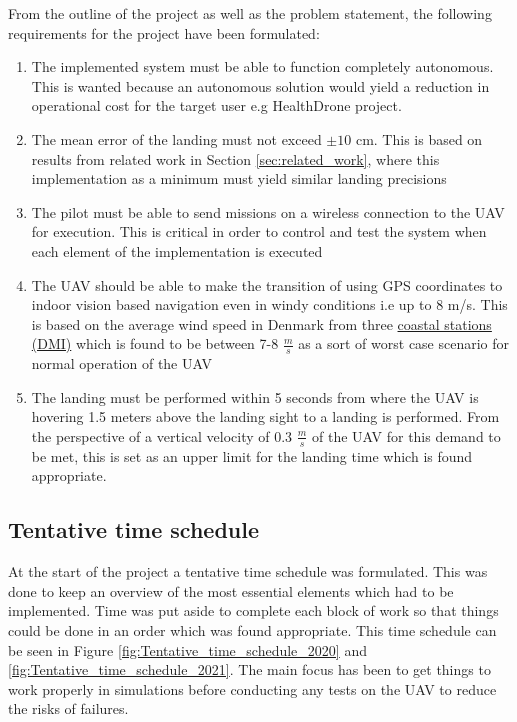 \documentclass[../Head/report.tex]{subfiles}
\begin{document}
From the outline of the project as well as the problem statement, the following requirements for the project have been formulated:

\begin{enumerate}[label=\textbf{R.\arabic*}]
	\item \label{sor:one} The implemented system must be able to function completely autonomous. This is wanted because an autonomous solution would yield a reduction in operational cost for the target user e.g HealthDrone project.   
    \item \label{sor:two} The mean error of the landing must not exceed $\pm 10$ cm. This is based on results from related work in Section \ref{sec:related_work}, where this implementation as a minimum must yield similar landing precisions
    \item \label{sor:three} The pilot must be able to send missions on a wireless connection to the UAV for execution. This is critical in order to control and test the system when each element of the implementation is executed 
    \item \label{sor:four} The UAV should be able to make the transition of using GPS coordinates to indoor vision based navigation even in windy conditions i.e up to 8 m/s. This is based on the average wind speed in Denmark from three \href{https://www.dmi.dk/klima/temaforside-klimaet-frem-til-i-dag/vind-i-danmark/}{coastal stations (DMI)} which is found to be between 7-8 $\frac{m}{s}$ as a sort of worst case scenario for normal operation of the UAV
    \item \label{sor:five} The landing must be performed within 5 seconds from where the UAV is hovering 1.5 meters above the landing sight to a landing is performed. From the perspective of a vertical velocity of 0.3 $\frac{m}{s}$ of the UAV for this demand to be met, this is set as an upper limit for the landing time which is found appropriate.   

\end{enumerate}


\newpage
\subsection{Tentative time schedule}
\label{sec:tentative_time_schedule}

At the start of the project a tentative time schedule was formulated. This was done to keep an overview of the most essential elements which had to be implemented. Time was put aside to complete each block of work so that things could be done in an order which was found appropriate.  This time schedule can be seen in Figure \ref{fig:Tentative_time_schedule_2020} and \ref{fig:Tentative_time_schedule_2021}. The main focus has been to get things to work properly in simulations before conducting any tests on the UAV to reduce the risks of failures.  
\end{document}
